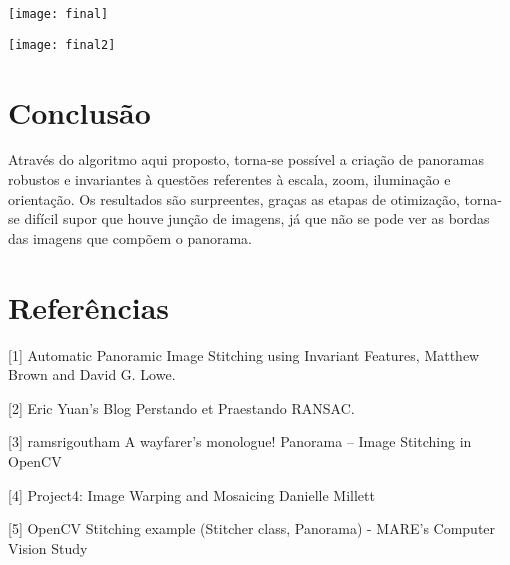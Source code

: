 \documentclass[conference]{IEEEtran}
\begin{document}
	
		
		\vspace{2\baselineskip}\vspace{-\parskip}
		\begin{minipage}{\linewidth}
  		\centering
  		\texttt{[image: final]}
		\end{minipage}
	
		
		\vspace{2\baselineskip}\vspace{-\parskip}
		\begin{minipage}{\linewidth}
  		\centering
  		\texttt{[image: final2]}
		\end{minipage}	
	
	
\section{Conclus\~ao} 
\label{sec:meth} 

Atrav\'es do algoritmo aqui proposto, torna-se poss\'ivel a cria\c{c}\~ao de panoramas robustos e invariantes \`a quest\~oes
referentes \`a escala, zoom, ilumina\c{c}\~ao e orienta\c{c}\~ao. Os resultados s\~ao surpreentes, gra\c{c}as  as etapas de
otimiza\c{c}\~ao, torna-se dif\'icil supor que houve jun\c{c}\~ao de imagens, j\'a que n\~ao se pode ver as bordas das imagens
 que comp\~oem o panorama.

\section{Refer\^encias} 
\label{sec:meth} 

[1] Automatic Panoramic Image Stitching using Invariant Features, Matthew Brown and David G. Lowe.

[2] Eric Yuan's Blog Perstando et Praestando RANSAC.

[3] ramsrigoutham A wayfarer's monologue! Panorama – Image Stitching in OpenCV

[4] Project4: Image Warping and Mosaicing Danielle Millett

[5]  OpenCV Stitching example (Stitcher class, Panorama) - MARE's Computer Vision Study
\end{document}
